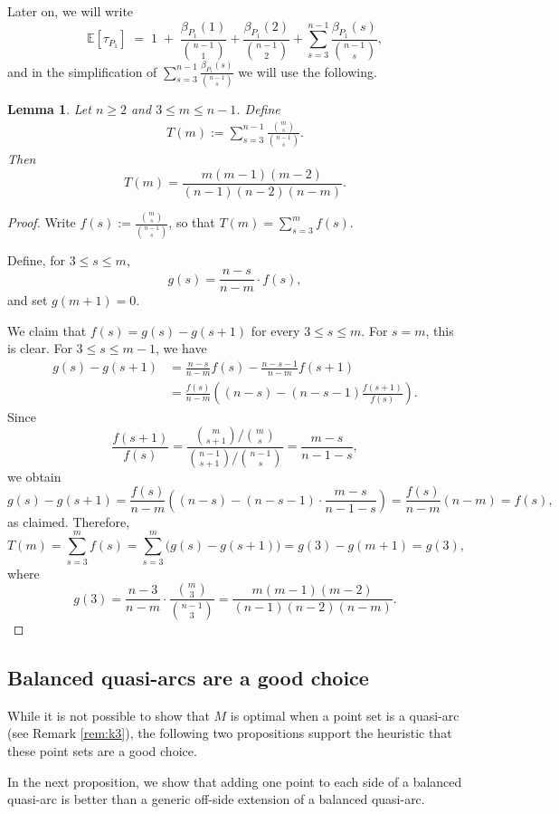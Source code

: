 \documentclass{article}
\newtheorem{lemma}{Lemma}
\newcommand{\E}{\mathbb{E}}
\begin{document}
Later on, we will write
\[
\E[\tau_{P_1}]\;=\;1 \;+\;\frac{\beta_{P_1}(1)}{\binom{n-1}{1}}+\frac{\beta_{P_1}(2)}{\binom{n-1}{2}}+\sum_{s=3}^{n-1}\frac{\beta_{P_1}(s)}{\binom{n-1}{s}},
\]
and in the simplification of $\sum_{s=3}^{n-1}\frac{\beta_{P_1}(s)}{\binom{n-1}{s}}$ we will use the following.



\begin{lemma}\label{lem:UT}
Let $n\ge 2$ and $3\le m\le n-1$. Define
\begin{align}
T(m):=\sum_{s=3}^{n-1}\frac{\binom{m}{s}}{\binom{n-1}{s}}. \label{eq:Tdef}
\end{align}
Then
\[
T(m)=\frac{m(m-1)(m-2)}{(n-1)(n-2)(n-m)}.
\]
\end{lemma}

\begin{proof}
Write $f(s):=\frac{\binom{m}{s}}{\binom{n-1}{s}}$, so that $T(m)=\sum_{s=3}^{m}f(s)$.

Define, for $3\le s\le m$,
\[
g(s)=\frac{n-s}{n-m}\cdot f(s),
\]
and set $g(m+1)=0$.

We claim that
$f(s)=g(s)-g(s+1)$ 
for every $3\le s\le m$. For $s=m$, this is clear. For $3\le s\le m-1$, we have
\begin{align*}
g(s)-g(s+1)
&=\frac{n-s}{n-m}f(s)-\frac{n-s-1}{n-m}f(s+1) \\
&=\frac{f(s)}{n-m}\left((n-s)-(n-s-1)\frac{f(s+1)}{f(s)}\right).
\end{align*}
Since
\[
\frac{f(s+1)}{f(s)}
=\frac{\binom{m}{s+1}\big/\binom{m}{s}}
{\binom{n-1}{s+1}\big/\binom{n-1}{s}}
=\frac{m-s}{n-1-s},
\]
we obtain
\[
g(s)-g(s+1)
=\frac{f(s)}{n-m}\left((n-s)-(n-s-1)\cdot\frac{m-s}{n-1-s}\right)
=\frac{f(s)}{n-m}\left(n-m\right)=f(s),
\]
as claimed. Therefore,
\[
T(m)=\sum_{s=3}^{m}f(s)
=\sum_{s=3}^{m}\bigl(g(s)-g(s+1)\bigr)
=g(3)-g(m+1)
=g(3),
\]
where\[
g(3)=\frac{n-3}{n-m}\cdot \frac{\binom{m}{3}}{\binom{n-1}{3}}
=\frac{m(m-1)(m-2)}{(n-1)(n-2)(n-m)}.
\] \end{proof}

\subsection{Balanced quasi-arcs are a good choice}\label{subs:opt}
While it is not possible to show that $M$ is optimal when a point set is a quasi-arc (see Remark \ref{rem:k3}), the following two propositions support the heuristic that these point sets are a good choice.


In the next proposition, we show that adding one point to each side of a balanced quasi-arc is better than a generic off-side extension of a balanced quasi-arc.
\end{document}
